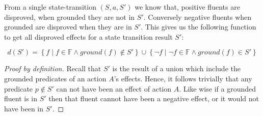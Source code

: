 \documentclass[../Master.tex]{subfiles}
\begin{document}
\begin{theorem}
	 From a single state-transition $(S,a,S')$ we know that,
	positive fluents are disproved, when grounded they are not in $S'$. Conversely negative fluents when grounded are disproved when they are in $S'$. This gives us the following function to get all disproved effects for a state transition result $S'$:
	
	\begin{equation*}
		 d(S') = \left\{
			f \; | \; f \in \mathbb{F} \land ground(f) \notin S'
			\right\} 
			\cup
			 \left\{
			\neg f \; | \; \neg f \in \mathbb{F} \land ground(f) \in S'
			\right\}
	\end{equation*}
	\begin{proof}[Proof by definition]
		Recall that $S'$ is the result of a union which include the grounded predicates of an action $A$'s effects. Hence, it follows trivially that any predicate $p \notin S'$ can not have been an effect of action $A$.
	Like wise if a grounded fluent is in $S'$ then that fluent cannot have been a negative effect, or it would not have been in $S'$.
	\end{proof}
\end{theorem}
\end{document}
